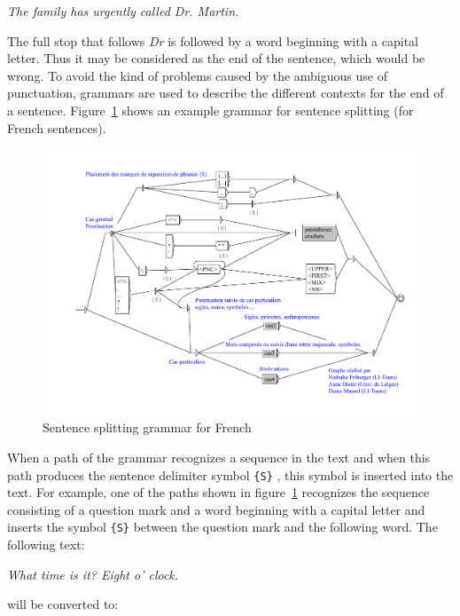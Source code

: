 \bigskip
\textit{The family has urgently called Dr. Martin.}

\bigskip \noindent The full stop that follows \textit{Dr} is followed by a word
beginning with a capital letter. Thus it may be considered as the end of the
sentence, which would be wrong. To avoid the kind of problems caused by the
ambiguous use of punctuation, grammars are used to  describe the different
contexts for the end of a sentence.
Figure~\ref{fig-example-sentence-splitting} shows an example grammar for
sentence splitting (for French sentences).

\begin{figure}[!h]
\begin{center}
\includegraphics[width=15cm]{resources/img/fig2-10.pdf}
\caption{Sentence splitting grammar for
French\label{fig-example-sentence-splitting}}
\end{center}
\end{figure}

\bigskip
\noindent When a path of the grammar recognizes a sequence in the text and when
this path produces the sentence delimiter symbol \verb+{S}+
, this symbol is inserted into the
text. For example, one of the paths shown in
figure~\ref{fig-example-sentence-splitting} recognizes the sequence consisting
of a question mark and a word beginning with a capital letter and inserts the 
symbol \verb+{S}+ between the question mark and
the following word. The following text:

\bigskip
\textit{What time is it? Eight o' clock.}

\bigskip
\noindent will be converted to:

